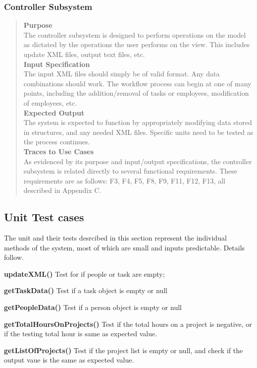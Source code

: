 \documentclass[12pt]{article}
\begin{document}
\subsubsection{Controller Subsystem}

\begin{quote}
{\bf Purpose}
\\
{
The controller subsystem is designed to perform operations on the model as dictated by the operations the user performs on the view. This includes update XML files, output text files, etc.
}
\\
{\bf Input Specification}
\\
{
The input XML files should simply be of valid format. Any data combinations should work. The workflow process can begin at one of many points, including the addition/removal of tasks or employees, modification of employees, etc.
}
\\
{\bf Expected Output}
\\
{
The system is expected to function by appropriately modifying data stored in structures, and any needed XML files. Specific units need to be tested as the process continues.
}
\\
{\bf Traces to Use Cases}
\\
{
As evidenced by its purpose and input/output specifications, the controller subsystem is related directly to several functional requirements. These requirements are as follows: F3, F4, F5, F8, F9, F11, F12, F13, all described in Appendix C.
}
\\
\end{quote}

\subsection{Unit Test cases}
{
The unit and their tests desrcibed in this section represent the individual methods of the system, most of which are small and inputs predictable. Details follow.
}


{\bf updateXML()}
{
Test for if people or task are empty; 
}

{\bf getTaskData()} 
{
Test if a task object is empty or null
}

{\bf getPeopleData()} 
{
Test if a person object is empty or null
}

{\bf getTotalHoursOnProjects()} 
{
Test if the total hours on a project is negative, or if the testing total hour is same as expected value.
}

{\bf getListOfProjects()}
{
Test if the project list is empty or null, and check if the output vaue is the same as expected value.
}
\end{document}
